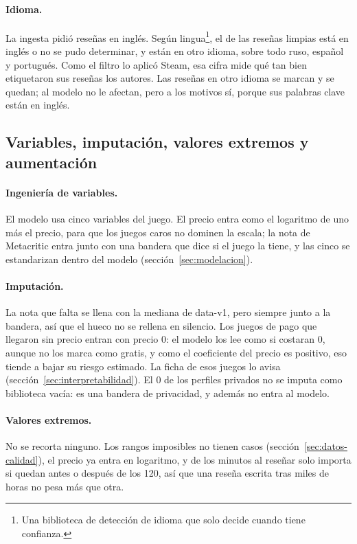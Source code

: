\paragraph{Idioma.}\label{sec:procesamiento-idioma} La ingesta pidió reseñas en inglés. Según
lingua\footnote{Una biblioteca de detección de idioma que solo decide cuando tiene confianza.}, el
\cifraIdiomaInglesPorResena{} de las reseñas limpias está en inglés o no se pudo determinar, y
\cifraOtroIdioma{} están en otro idioma, sobre todo ruso, español y portugués. Como el filtro lo
aplicó Steam, esa cifra mide qué tan bien etiquetaron sus reseñas los autores. Las reseñas en otro
idioma se marcan y se quedan; al modelo no le afectan, pero a los motivos sí, porque sus palabras
clave están en inglés.

\subsection{Variables, imputación, valores extremos y aumentación}\label{sec:procesamiento-precio}

\paragraph{Ingeniería de variables.} El modelo usa cinco variables del juego. El precio entra como
el logaritmo de uno más el precio, para que los juegos caros no dominen la escala; la nota de
Metacritic entra junto con una bandera que dice si el juego la tiene, y las cinco se estandarizan
dentro del modelo (sección~\ref{sec:modelacion}).

\paragraph{Imputación.} La nota que falta se llena con la mediana de data-v1, pero siempre junto a
la bandera, así que el hueco no se rellena en silencio. Los \cifraPagoSinPrecioEntrenamiento{}
juegos de pago que llegaron sin precio entran con precio 0: el modelo los lee como si costaran 0,
aunque no los marca como gratis, y como el coeficiente del precio es positivo, eso tiende a bajar
su riesgo estimado. La ficha de esos juegos lo avisa (sección~\ref{sec:interpretabilidad}). El 0
de los perfiles privados no se imputa como biblioteca vacía: es una bandera de privacidad, y además
no entra al modelo.

\paragraph{Valores extremos.} No se recorta ninguno. Los rangos imposibles no tienen casos
(sección~\ref{sec:datos-calidad}), el precio ya entra en logaritmo, y de los minutos al reseñar
solo importa si quedan antes o después de los 120, así que una reseña escrita tras miles de horas
no pesa más que otra.

